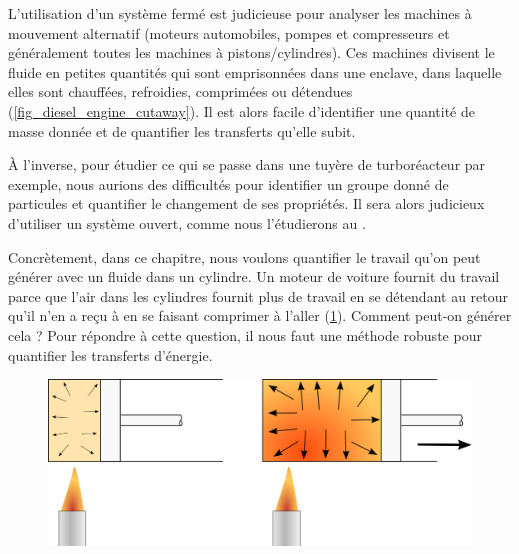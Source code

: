 		L’utilisation d’un système fermé est judicieuse pour analyser les machines à mouvement alternatif (moteurs automobiles, pompes et compresseurs et généralement toutes les machines à pistons/cylindres). Ces machines divisent le fluide en petites quantités qui sont emprisonnées dans une enclave, dans laquelle elles sont chauffées, refroidies, comprimées ou détendues (\cref{fig_diesel_engine_cutaway}). Il est alors facile d’identifier une quantité de masse donnée et de quantifier les transferts qu’elle subit.
		
		À l’inverse, pour étudier ce qui se passe dans une tuyère de turboréacteur par exemple, nous aurions des difficultés pour identifier un groupe donné de particules et quantifier le changement de ses propriétés. Il sera alors judicieux d’utiliser un système ouvert, comme nous l’étudierons au \courstrois.
		
		Concrètement, dans ce chapitre, nous voulons quantifier le travail qu’on peut générer avec un fluide dans un cylindre. Un moteur de voiture fournit du travail parce que l’air dans les cylindres fournit plus de travail en se détendant au retour qu’il n’en a reçu à en se faisant comprimer à l’aller (\cref{fig_moteur_sf}). Comment peut-on générer cela ? Pour répondre à cette question, il nous faut une méthode robuste pour quantifier les transferts d’énergie.

		\begin{figure}
			\begin{center}
			\includegraphics[width=\textwidth]{images/fonctionnement_base_moteur.png}
			\end{center}
			\label{fig_moteur_sf}
		\end{figure}


